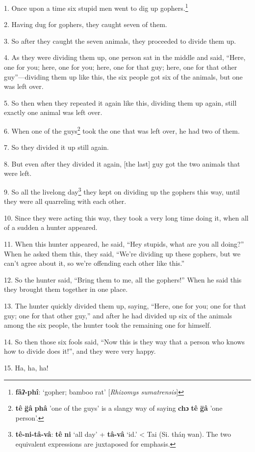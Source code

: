 \setcounter{footnote}{0}

1. Once upon a time six stupid men went to dig up gophers.\footnote{\textbf{fâʔ-phî}: `gopher; bamboo rat' [\textit{Rhizomys sumatrensis}]}

2. Having dug for gophers, they caught seven of them.

3. So after they caught the seven animals, they proceeded to divide them up.

4. As they were dividing them up, one person sat in the middle and said, ``Here,
one for you; here, one for you; here, one for that guy; here, one for that other
guy''---dividing them up like this, the six people got six of the animals, but
one was left over.

5. So then when they repeated it again like this, dividing them up again, still
exactly one animal was left over.

6. When one of the guys\footnote{\textbf{tê} \textbf{g̈â} \textbf{phâ} 'one of the guys' is a slangy way of saying \textbf{chɔ} \textbf{tê} \textbf{g̈â} 'one person'.} took the one that was left over, he had two of them.

7. So they divided it up still again.

8. But even after they divided it again, [the last] guy got the two animals that
were left.

9. So all the livelong day\footnote{\textbf{tê-ni-tâ-vâ}: \textbf{tê} \textbf{ni} `all day' + \textbf{tâ-vâ} `id.' < Tai (Si. tháŋ wan). The two equivalent expressions are juxtaposed for emphasis.} they kept on dividing up the gophers this way, until
they were all quarreling with each other.

10. Since they were acting this way, they took a very long time doing it, when
all of a sudden a hunter appeared.

11. When this hunter appeared, he said, ``Hey stupids, what are you all doing?''
When he asked them this, they said, ``We're dividing up these gophers, but we can't
agree about it, so we're offending each other like this.''

12. So the hunter said, ``Bring them to me, all the gophers!'' When he said this
they brought them together in one place.

13. The hunter quickly divided them up, saying, ``Here, one for you; one for that
guy; one for that other guy,'' and after he had divided up six of the animals among
the six people, the hunter took the remaining one for himself.

14. So then those six fools said, ``Now this is they way that a person who knows
how to divide does it!'', and they were very happy.

15. Ha, ha, ha!

